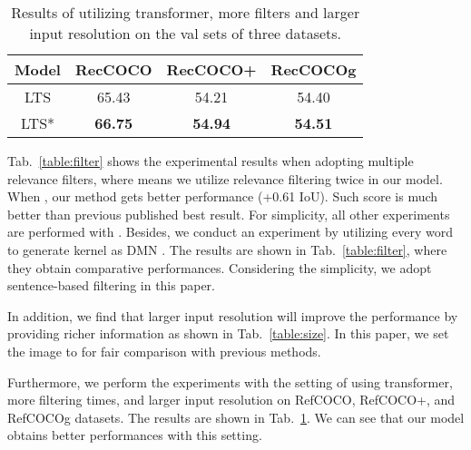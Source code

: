\begin{table}[!ht]
\begin{center}
\caption{Results of utilizing transformer, more filters and larger input resolution on the val sets of three datasets.}
\label{table:best}
\begin{tabular}{|c||c|c|c|}
\hline
{Model}&{RecCOCO}&{RecCOCO+}&{RecCOCOg} \\
\hline
\hline
{LTS}&{65.43}&{54.21}&{54.40}\\
\hline
{LTS*}&{\textbf{66.75}}&{\textbf{54.94}}&{\textbf{54.51}}\\
\hline
\end{tabular}
\end{center}
\end{table}


Tab.~\ref{table:filter} shows the experimental results when adopting multiple relevance filters, where  means we utilize relevance filtering twice in our model. When , our method gets better performance (+0.61 IoU). Such score is much better than previous published best result. For simplicity, all other experiments are performed with . Besides, we conduct an experiment by utilizing every word to generate kernel as DMN \cite{margffoy2018dynamic}. The results are shown in Tab.~\ref{table:filter}, where they obtain comparative performances. Considering the simplicity, we adopt sentence-based filtering in this paper.  


In addition, we find that larger input resolution will improve the performance by providing richer information as shown in Tab.~\ref{table:size}. In this paper, we set the image to  for fair comparison with previous methods.

Furthermore, we perform the experiments with the setting of using transformer, more filtering times, and larger input resolution on RefCOCO, RefCOCO+, and RefCOCOg datasets. The results are shown in Tab.~\ref{table:best}. We can see that our model obtains better performances with this setting. 


